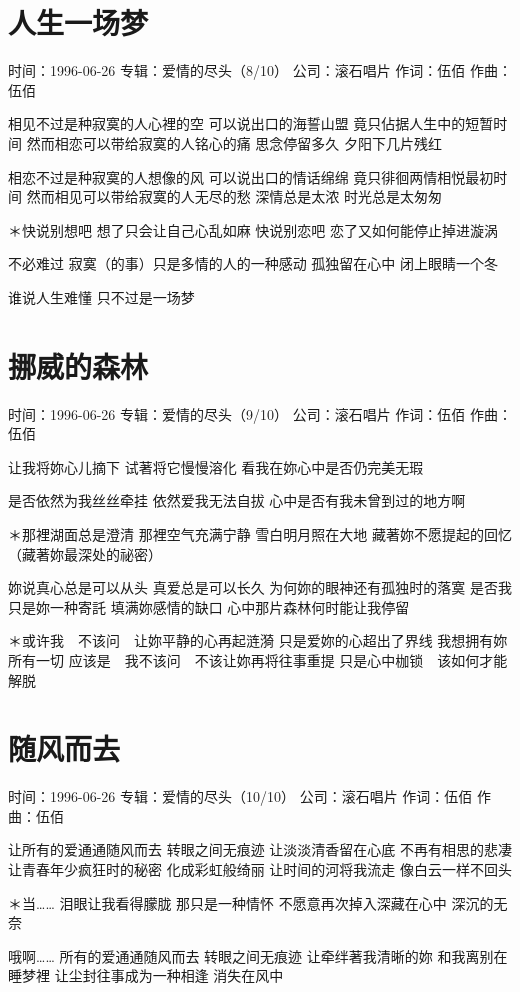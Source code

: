 \documentclass[UTF8,a4paper,oneside,twocolumn,12pt]{ctexbook}
\newcommand{\infopair}[2]{\textbullet #1：#2}
\newcommand{\zc}[1][伍佰]{\infopair{作词}{#1}}
\newcommand{\zq}[1][伍佰]{\infopair{作曲}{#1}}
\newcommand{\zj}[1]{\infopair{专辑}{#1}}
\newcommand{\sj}[1]{\infopair{时间}{#1}}
\newcommand{\gs}[1]{\infopair{公司}{#1}}
\newenvironment{info}{\begin{flushleft}\kaishu
	}
	{\end{flushleft}\normalsize\yahei\par}
\newenvironment{lyric}{
	}
{}
\begin{document}
\section{人生一场梦}
\begin{info}
	\sj{1996-06-26}
	\zj{爱情的尽头（8/10）}
	\gs{滚石唱片}
	\zc
	\zq
\end{info}
\begin{lyric}
	相见不过是种寂寞的人心裡的空
	可以说出口的海誓山盟 竟只佔据人生中的短暂时间
	然而相恋可以带给寂寞的人铭心的痛
	思念停留多久 夕阳下几片残红

	相恋不过是种寂寞的人想像的风
	可以说出口的情话绵绵 竟只徘徊两情相悦最初时间
	然而相见可以带给寂寞的人无尽的愁
	深情总是太浓 时光总是太匆匆

	＊快说别想吧
	想了只会让自己心乱如麻
	快说别恋吧
	恋了又如何能停止掉进漩涡

	不必难过 寂寞（的事）只是多情的人的一种感动
	孤独留在心中 闭上眼睛一个冬

	谁说人生难懂 只不过是一场梦
\end{lyric}

\section{挪威的森林}
\begin{info}
	\sj{1996-06-26}
	\zj{爱情的尽头（9/10）}
	\gs{滚石唱片}
	\zc
	\zq
\end{info}
\begin{lyric}
	让我将妳心儿摘下
	试著将它慢慢溶化
	看我在妳心中是否仍完美无瑕

	是否依然为我丝丝牵挂
	依然爱我无法自拔
	心中是否有我未曾到过的地方啊

	＊那裡湖面总是澄清
	那裡空气充满宁静
	雪白明月照在大地
	藏著妳不愿提起的回忆
	（藏著妳最深处的祕密）

	妳说真心总是可以从头
	真爱总是可以长久
	为何妳的眼神还有孤独时的落寞
	是否我只是妳一种寄託
	填满妳感情的缺口
	心中那片森林何时能让我停留

	＊或许我　不该问　让妳平静的心再起涟漪
	只是爱妳的心超出了界线
	我想拥有妳所有一切
	应该是　我不该问　不该让妳再将往事重提
	只是心中枷锁　该如何才能解脱
\end{lyric}

\section{随风而去}
\begin{info}
	\sj{1996-06-26}
	\zj{爱情的尽头（10/10）}
	\gs{滚石唱片}
	\zc
	\zq
\end{info}
\begin{lyric}
	让所有的爱通通随风而去
	转眼之间无痕迹
	让淡淡清香留在心底
	不再有相思的悲凄
	让青春年少疯狂时的秘密
	化成彩虹般绮丽
	让时间的河将我流走
	像白云一样不回头

	＊当……
	泪眼让我看得朦胧
	那只是一种情怀
	不愿意再次掉入深藏在心中
	深沉的无奈

	哦啊……
	所有的爱通通随风而去
	转眼之间无痕迹
	让牵绊著我清晰的妳
	和我离别在睡梦裡
	让尘封往事成为一种相逢
	消失在风中
\end{lyric}
\end{document}
